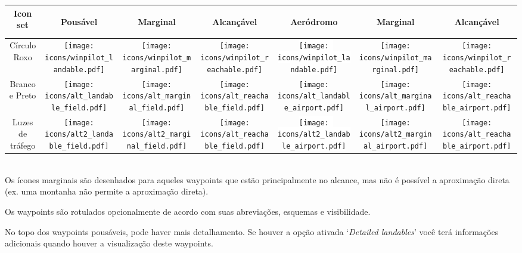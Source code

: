 \begin{tabular}{c|ccc|ccc|}
Icon set 
&\begin{sideways}Pousável\end{sideways}
&\begin{sideways}Marginal\end{sideways}
&\begin{sideways}Alcançável\end{sideways}
&\begin{sideways}Aeródromo\end{sideways}
&\begin{sideways}Marginal\end{sideways}
&\begin{sideways}Alcançável\end{sideways}\\
\hline
Círculo Roxo &
\texttt{[image: icons/winpilot\_landable.pdf]} &
\texttt{[image: icons/winpilot\_marginal.pdf]} &
\texttt{[image: icons/winpilot\_reachable.pdf]} &
\colorbox{white}{\texttt{[image: icons/winpilot\_landable.pdf]}} &
\texttt{[image: icons/winpilot\_marginal.pdf]} &
\texttt{[image: icons/winpilot\_reachable.pdf]} \\
\hline
Branco e Preto &
\texttt{[image: icons/alt\_landable\_field.pdf]} &
\texttt{[image: icons/alt\_marginal\_field.pdf]} &
\texttt{[image: icons/alt\_reachable\_field.pdf]} &
\colorbox[rgb]{0.94,0.94,0.94}{\texttt{[image: icons/alt\_landable\_airport.pdf]}} &
\texttt{[image: icons/alt\_marginal\_airport.pdf]} &
\texttt{[image: icons/alt\_reachable\_airport.pdf]} \\
\hline
Luzes de tráfego &
\texttt{[image: icons/alt2\_landable\_field.pdf]} &
\texttt{[image: icons/alt2\_marginal\_field.pdf]} &
\texttt{[image: icons/alt\_reachable\_field.pdf]} &
\colorbox{white}{\texttt{[image: icons/alt2\_landable\_airport.pdf]}} &
\texttt{[image: icons/alt2\_marginal\_airport.pdf]} &
\texttt{[image: icons/alt\_reachable\_airport.pdf]} \\
\hline
\end{tabular} \\

Os ícones marginais são desenhados para aqueles waypoints que estão principalmente no alcance, mas não é possível a aproximação direta (ex. uma montanha não permite a aproximação direta).
  
Os waypoints são rotulados opcionalmente de acordo com suas abreviações, esquemas e visibilidade.

No topo dos waypoints pousáveis, pode haver mais detalhamento.  Se houver a opção ativada 
`{\it Detailed landables}' você terá informações adicionais quando houver a visualização deste waypoints.

